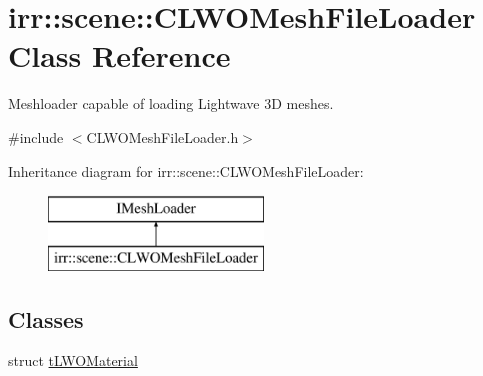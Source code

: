 \hypertarget{classirr_1_1scene_1_1_c_l_w_o_mesh_file_loader}{\section{irr\-:\-:scene\-:\-:C\-L\-W\-O\-Mesh\-File\-Loader Class Reference}
\label{classirr_1_1scene_1_1_c_l_w_o_mesh_file_loader}
}


Meshloader capable of loading Lightwave 3\-D meshes.  




{\ttfamily \#include $<$C\-L\-W\-O\-Mesh\-File\-Loader.\-h$>$}

Inheritance diagram for irr\-:\-:scene\-:\-:C\-L\-W\-O\-Mesh\-File\-Loader\-:\begin{figure}[H]
\begin{center}
\leavevmode
\includegraphics[height=2.000000cm]{classirr_1_1scene_1_1_c_l_w_o_mesh_file_loader}
\end{center}
\end{figure}
\subsection*{Classes}
\begin{DoxyCompactItemize}
\item 
struct \hyperlink{structirr_1_1scene_1_1_c_l_w_o_mesh_file_loader_1_1t_l_w_o_material}{t\-L\-W\-O\-Material}
\end{DoxyCompactItemize}
